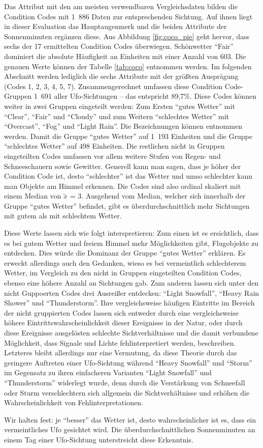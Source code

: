 Das Attribut mit den am meisten verwendbaren Vergleichsdaten bilden die Condition Codes mit 1~886 Daten zur entsprechenden Sichtung. Auf ihnen liegt in dieser Evaluation das Hauptaugenmerk und die beiden Attribute der Sonnenminuten ergänzen diese. Aus Abbildung \ref{fig:coco_pie} geht hervor, dass sechs der 17 ermittelten Condition Codes überwiegen. Schönwetter \enquote{Fair} dominiert die absolute Häufigkeit an Einheiten mit einer Anzahl von 603. Die genauen Werte können der Tabelle \ref{tab:coco} entnommen werden. Im folgenden Abschnitt werden lediglich die sechs Attribute mit der größten Ausprägung (Codes 1, 2, 3, 4, 5, 7). Zusammengerechnet umfassen diese Condition Code-Gruppen 1~691 aller Ufo-Sichtungen -- das entspricht 89,7\%. Diese Codes können weiter in zwei Gruppen eingeteilt werden: Zum Ersten \enquote{gutes Wetter} mit \enquote{Clear}, \enquote{Fair} und \enquote{Cloudy} und zum Weitern \enquote{schlechtes Wetter} mit \enquote{Overcast}, \enquote{Fog} und \enquote{Light Rain}. Die Bezeichnungen können \cite{coco:2021} entnommen werden. Damit die Gruppe \enquote{gutes Wetter} auf 1~193 Einheiten und die Gruppe \enquote{schlechtes Wetter} auf 498 Einheiten. Die restlichen nicht in Gruppen eingeteilten Codes umfassen vor allem weitere Stufen von Regen- und Schneeschauern sowie Gewitter. Generell kann man sagen, dass je höher der Condition Code ist, desto \enquote{schlechter} ist das Wetter und umso schlechter kann man Objekte am Himmel erkennen. Die Codes sind also ordinal skaliert mit einem Median von $\tilde{x}$ = 3. Ausgehend vom Median, welcher sich innerhalb der Gruppe \enquote{gutes Wetter} befindet, gibt es überdurchschnittlich mehr Sichtungen mit gutem als mit schlechtem Wetter.

Diese Werte lassen sich wie folgt interspretieren: Zum einen ist es ersichtlich, dass es bei gutem Wetter und freiem Himmel mehr Möglichkeiten gibt, Flugobjekte zu entdecken. Dies würde die Dominanz der Gruppe \enquote{gutes Wetter} erklären. Es erweckt allerdings auch den Gedanken, wieso es bei vermeintlich schlechterem Wetter, im Vergleich zu den nicht in Gruppen eingeteilten Condition Codes, ebenso eine höhere Anzahl an Sichtungen gab. Zum anderen lassen sich unter den nicht Guppoerten Codes drei Ausreißer entdecken: \enquote{Light Snowfall}, \enquote{Heavy Rain Shower} und \enquote{Thunderstorm}. Ihre vergleichsweise häufigen Eintritte im Bereich der nicht gruppierten Codes lassen sich entweder durch eine vergleichsweise höhere Eintrittswahrscheinlichkeit dieser Ereignisse in der Natur, oder durch diese Ereignisse ausgelösten schlechte Sichtverhältnisse und die damit verbundene Möglichkeit, dass Signale und Lichte fehlinterpretiert werden, beschreiben. Letzteres bleibt allerdings nur eine Vermutung, da diese Theorie durch das geringere Auftreten einer Ufo-Sichtung während \enquote{Heavy Snowfall} und \enquote{Storm} im Gegensatz zu ihren einfacheren Varianten \enquote{Light Snowfall} und \enquote{Thunderstorm} widerlegt wurde, denn durch die Verstärkung von Schneefall oder Sturm verschlechtern sich allgemein die Sichtverhältnisse und erhöhen die Wahrscheinlichkeit von Fehlinterpretationen.

Wir halten fest: je \enquote{besser} das Wetter ist, desto wahrscheinlicher ist es, dass ein vermeintliches Ufo gesichtet wird. Die überdurchschnittlichen Sonnenminuten an einem Tag einer Ufo-Sichtung unterstreicht diese Erkenntnis.


